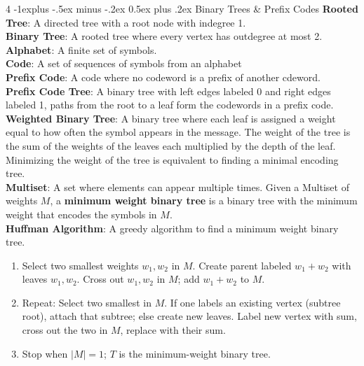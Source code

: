 \documentclass[letterpaper, 8pt]{extarticle}
\makeatletter
\renewcommand{\section}{\@startsection{section}{1}{0mm}%
	{-1explus -.5ex minus -.2ex}%
	{0.5ex plus .2ex}%
	{\normalfont\normalsize\bfseries}}
\makeatother
\begin{document}
\begin{multicols*}{4}
	\section{Binary Trees \& Prefix Codes}
	\textbf{Rooted Tree}: A directed tree with a root node with indegree 1. \\
	\textbf{Binary Tree}: A rooted tree where every vertex has outdegree at most 2. \\
	\textbf{Alphabet}: A finite set of symbols. \\
	\textbf{Code}: A set of sequences of symbols from an alphabet \\
	\textbf{Prefix Code}: A code where no codeword is a prefix of another cdeword. \\
	\textbf{Prefix Code Tree}: A binary tree with left edges labeled 0 and right edges labeled 1, paths from the root to a leaf form the codewords in a prefix code. \\
	\textbf{Weighted Binary Tree}: A binary tree where each leaf is assigned a weight equal to how often the symbol appears in the message. The weight of the tree is the sum of the weights of the leaves each multiplied by the depth of the leaf. Minimizing the weight of the tree is equivalent to finding a minimal encoding tree. \\
	\textbf{Multiset}: A set where elements can appear multiple times. Given a Multiset of weights $M$, a \textbf{minimum weight binary tree} is a binary tree with the minimum weight that encodes the symbols in $M$. \\
	\textbf{Huffman Algorithm}: A greedy algorithm to find a minimum weight binary tree.
	\begin{enumerate}
		\item Select two smallest weights $w_1, w_2$ in $M$. Create parent labeled $w_1 + w_2$ with leaves $w_1, w_2$. Cross out $w_1, w_2$ in $M$; add $w_1 + w_2$ to $M$.
		\item Repeat: Select two smallest in $M$. If one labels an existing vertex (subtree root), attach that subtree; else create new leaves. Label new vertex with sum, cross out the two in $M$, replace with their sum.
		\item Stop when $|M| = 1$; $T$ is the minimum-weight binary tree.
	\end{enumerate}


\end{multicols*}
\end{document}
